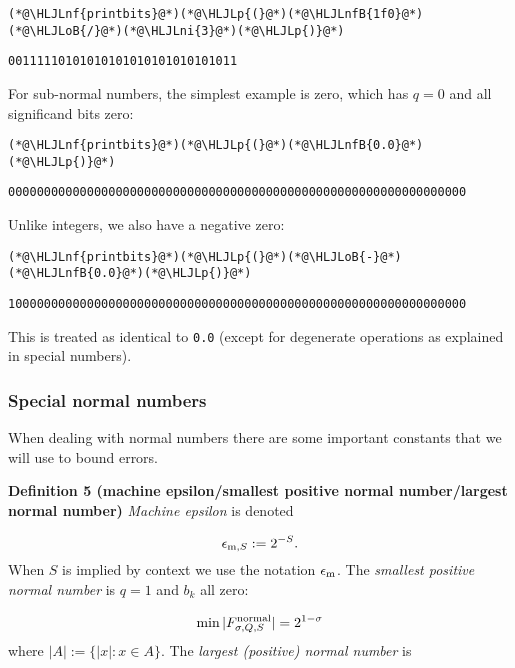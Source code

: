 \documentclass[12pt,a4paper]{article}
\newcommand{\HLJLnf}[1]{\textcolor[RGB]{66,102,213}{#1}}
\newcommand{\HLJLnfB}[1]{\textcolor[RGB]{59,151,46}{#1}}
\newcommand{\HLJLni}[1]{\textcolor[RGB]{59,151,46}{#1}}
\newcommand{\HLJLoB}[1]{\textcolor[RGB]{102,102,102}{\textbf{#1}}}
\newcommand{\HLJLp}[1]{#1}
\begin{document}
\begin{lstlisting}
(*@\HLJLnf{printbits}@*)(*@\HLJLp{(}@*)(*@\HLJLnfB{1f0}@*)(*@\HLJLoB{/}@*)(*@\HLJLni{3}@*)(*@\HLJLp{)}@*)
\end{lstlisting}

\begin{lstlisting}
00111110101010101010101010101011
\end{lstlisting}


For sub-normal numbers, the simplest example is zero, which has $q=0$ and all significand bits zero:


\begin{lstlisting}
(*@\HLJLnf{printbits}@*)(*@\HLJLp{(}@*)(*@\HLJLnfB{0.0}@*)(*@\HLJLp{)}@*)
\end{lstlisting}

\begin{lstlisting}
0000000000000000000000000000000000000000000000000000000000000000
\end{lstlisting}


Unlike integers, we also have a negative zero:


\begin{lstlisting}
(*@\HLJLnf{printbits}@*)(*@\HLJLp{(}@*)(*@\HLJLoB{-}@*)(*@\HLJLnfB{0.0}@*)(*@\HLJLp{)}@*)
\end{lstlisting}

\begin{lstlisting}
1000000000000000000000000000000000000000000000000000000000000000
\end{lstlisting}


This is treated as identical to \texttt{0.0} (except for degenerate operations as explained in special numbers).

\subsubsection{Special normal numbers}
When dealing with normal numbers there are some important constants that we will use to bound errors.

\textbf{Definition 5 (machine epsilon/smallest positive normal number/largest normal number)} \emph{Machine epsilon} is denoted

\[
\ensuremath{\epsilon}_{{\rm m},S} := 2^{-S}.
\]
When $S$ is implied by context we use the notation $\ensuremath{\epsilon}_{\rm m}$. The \emph{smallest positive normal number} is $q = 1$ and $b_k$ all zero:

\[
\min |F_{\ensuremath{\sigma},Q,S}^{\rm normal}| = 2^{1-\ensuremath{\sigma}}
\]
where $|A| := \{|x| : x \ensuremath{\in} A \}$. The \emph{largest (positive) normal number} is
\end{document}
